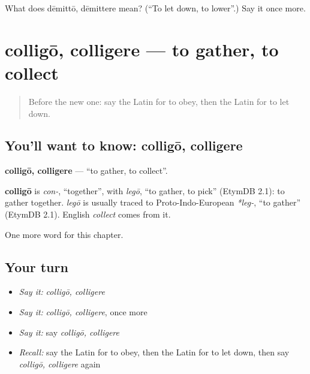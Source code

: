 \begin{tcolorbox}[breakable,colback=teal!4,colframe=teal!35!black,title={Before you move on}]
What does dēmittō, dēmittere mean? (\textquotedblleft{}To let down, to lower\textquotedblright{}.) Say it once more.
\end{tcolorbox}
\section[colligō, colligere]{colligō, colligere — to gather, to collect}

\label{lesson:LA-C234-colligo}



\begin{quote}
Before the new one: say the Latin for to obey, then the Latin for to let down.
\end{quote}

\subsection*{You'll want to know: colligō, colligere}
\textbf{colligō, colligere} — \textquotedblleft{}to gather, to collect\textquotedblright{}.

\begin{cousinweb}
\textbf{colligō} is \emph{con-}, \textquotedblleft{}together\textquotedblright{}, with \emph{legō}, \textquotedblleft{}to gather, to pick\textquotedblright{} (EtymDB 2.1): to gather together. \emph{legō} is usually traced to Proto-Indo-European \emph{*leg-}, \textquotedblleft{}to gather\textquotedblright{} (EtymDB 2.1). English \emph{collect} comes from it.
\end{cousinweb}

\begin{grammarlens}[title={What you've built}]
One more word for this chapter.
\end{grammarlens}

\subsection*{Your turn}
\begin{itemize}
\raggedright
  \item \emph{Say it:} \emph{colligō, colligere}
  \item \emph{Say it:} \emph{colligō, colligere}, once more
  \item \emph{Say it:} say \emph{colligō, colligere}
  \item \emph{Recall:} say the Latin for to obey, then the Latin for to let down, then say \emph{colligō, colligere} again
\end{itemize}

